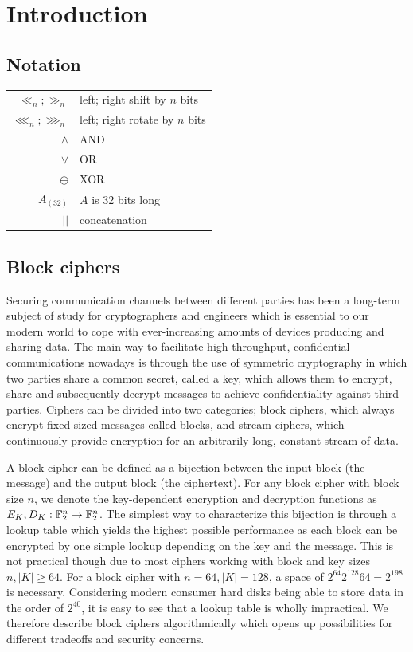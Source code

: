 \chapter{Introduction}
\section{Notation}

\begin{center}
    \begin{tabular}{rl}
        $\ll_n;\gg_n$ & left; right shift by $n$ bits \\
        $\lll_n;\ggg_n$ & left; right rotate by $n$ bits \\
        $\land$ & AND \\
        $\lor$ & OR \\
        $\oplus$ & XOR \\
        $A_{(32)}$ & $A$ is 32 bits long \\
        $||$ & concatenation
    \end{tabular}
\end{center}

\section{Block ciphers}

Securing communication channels between different parties has been a long-term
subject of study for cryptographers and engineers which is essential to our
modern world to cope with ever-increasing amounts of devices producing and
sharing data. The main way to facilitate high-throughput, confidential
communications nowadays is through the use of symmetric cryptography in which
two parties share a common secret, called a key, which allows them to encrypt,
share and subsequently decrypt messages to achieve confidentiality against
third parties. Ciphers can be divided into two categories; block ciphers, which
always encrypt fixed-sized messages called blocks, and stream ciphers, which
continuously provide encryption for an arbitrarily long, constant stream of
data.

A block cipher can be defined as a bijection between the input block (the
message) and the output block (the ciphertext). For any block cipher with block
size $n$, we denote the key-dependent encryption and decryption functions as
$E_K,D_K:\mathbb{F}_2^{n}\rightarrow \mathbb{F}_2^{n}$. The simplest way to
characterize this bijection is through a lookup table which yields the highest
possible performance as each block can be encrypted by one simple lookup
depending on the key and the message. This is not practical though due to most
ciphers working with block and key sizes $n,|K|\geq 64$. For a block cipher
with $n=64,|K|=128$, a space of $2^{64}2^{128}64=2^{198}$ is necessary.
Considering modern consumer hard disks being able to store data in the order of
$2^{40}$, it is easy to see that a lookup table is wholly impractical. We
therefore describe block ciphers algorithmically which opens up possibilities
for different tradeoffs and security concerns.


